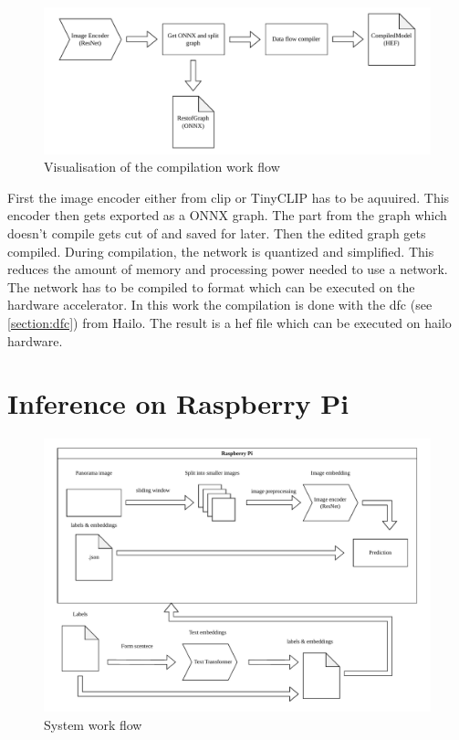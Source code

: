 \begin{figure}
    \centering
    \includegraphics[width=\textwidth]{Images/SystemOverview/DFCFlow.pdf}
    \caption{Visualisation of the compilation work flow}
    \label{fig:overview:dfcflow}
\end{figure}
First the image encoder either from \acrshort{clip} or TinyCLIP has to be aquuired.
This encoder then gets exported as a ONNX graph.
The part from the graph which doesn't compile gets cut of and saved for later.
Then the edited graph gets compiled.
During compilation, the network is quantized and simplified.
This reduces the amount of memory and processing power needed to use a network.
The network has to be compiled to format which can be executed on the hardware accelerator.
In this work the compilation is done with the \Acrlong{dfc} (see \cref{section:dfc}) from Hailo.
The result is a \acrshort{hef} file which can be executed on hailo hardware.

\section{Inference on Raspberry Pi}

\begin{figure}
    \centering
    \includegraphics[width=\textwidth]{Images/SystemOverview/Overview.drawio.pdf}
    \caption{System work flow}
    \label{fig:overview:overview}
\end{figure}

